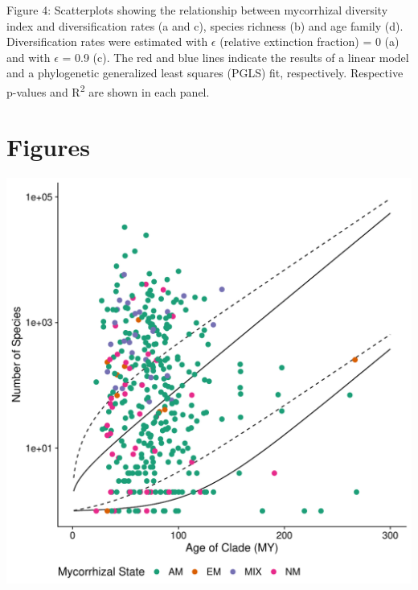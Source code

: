 \documentclass[
  12pt,
]{article}
\begin{document}
Figure 4: Scatterplots showing the relationship between mycorrhizal
diversity index and diversification rates (a and c), species richness
(b) and age family (d). Diversification rates were estimated with
\(\epsilon\) (relative extinction fraction) = 0 (a) and with
\(\epsilon\) = 0.9 (c). The red and blue lines indicate the results of a
linear model and a phylogenetic generalized least squares (PGLS) fit,
respectively. Respective p-values and R\textsuperscript{2} are shown in
each panel.

\newpage

\hypertarget{figures}{%
\section{Figures}\label{figures}}

\includegraphics{../output/figs/magsand_stem_nolabel.pdf}

\newpage
\end{document}
